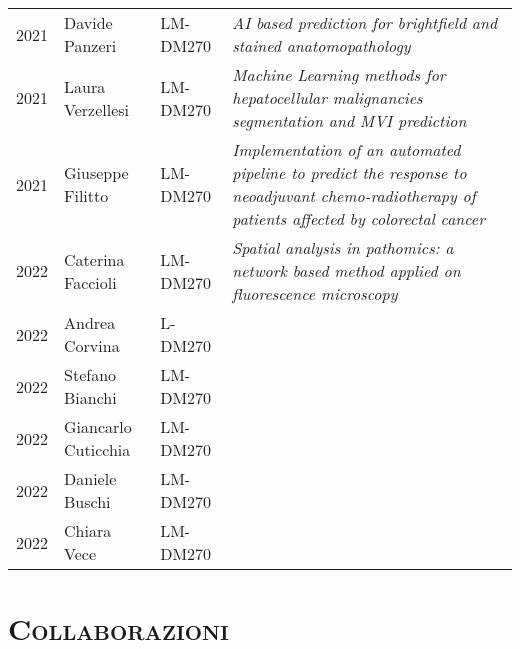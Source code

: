 \documentclass[a4paper,11pt]{article}
\begin{document}
\begin{tabular}{lllp{9cm}}
  2021 & Davide Panzeri        & LM-DM270 & \emph{AI based prediction for brightfield and stained anatomopathology}\\
  2021 & Laura Verzellesi      & LM-DM270 & \emph{Machine Learning methods for hepatocellular malignancies segmentation and MVI prediction}\\
  2021 & Giuseppe Filitto      & LM-DM270 & \emph{Implementation of an automated pipeline to predict the response to neoadjuvant chemo-radiotherapy of patients affected by colorectal cancer}\\
  2022 & Caterina Faccioli     & LM-DM270 & \emph{Spatial analysis in pathomics: a network based method applied on fluorescence microscopy}\\
  2022 & Andrea Corvina        & L-DM270  & \emph{}\\
  2022 & Stefano Bianchi       & LM-DM270 & \emph{}\\
  2022 & Giancarlo Cuticchia   & LM-DM270 & \emph{}\\
  2022 & Daniele Buschi        & LM-DM270 & \emph{}\\
  2022 & Chiara Vece           & LM-DM270 & \emph{}\\

\end{tabular}




\vspace*{0.5cm}
\section*{\scshape{Collaborazioni}}
\end{document}
